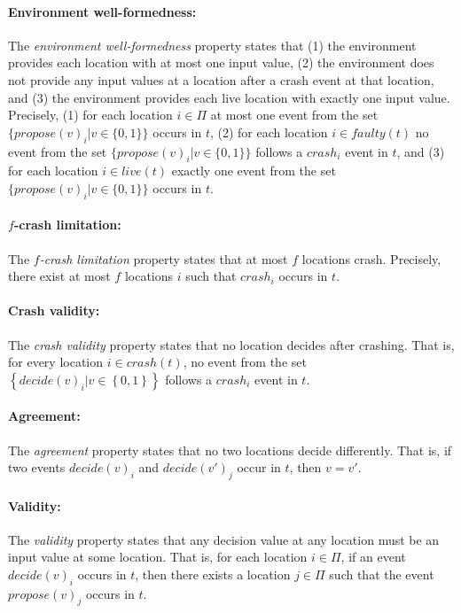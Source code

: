 \documentclass[11pt]{article}
\numberwithin{theorem}{section}
\newcommand{\set}[1]{\left\{#1\right\}}
\begin{document}
\paragraph{Environment well-formedness:} 
The \emph{environment well-formedness} property states that (1) the environment provides each location with 
at most one input value, (2) the environment does not provide any input values at a location after a crash event at that location, and (3) the environment provides each live location with exactly one input value. 
Precisely, (1) for each location $i \in \Pi$
at most one event from the set $\{propose(v)_i|v \in \{0,1\}\}$ occurs in $t$, (2) for each location $i \in faulty(t)$ no event from the set $\{propose(v)_i|v \in \{0,1\}\}$ follows a $crash_i$ event in $t$, and (3) for each location $i \in live(t)$ exactly one event from the set $\{propose(v)_i|v \in \{0,1\}\}$ occurs in $t$.

\paragraph{$f$-crash limitation:} The \emph{$f$-crash limitation} property states that at most $f$ locations crash. Precisely, there exist at most $f$ locations $i$ such that $crash_i$ occurs in $t$. 

\paragraph{Crash validity:} The \emph{crash validity} property states that no location decides after crashing.  That is, for every location $i \in crash(t)$, no event from the set $\set{decide(v)_i| v \in \set{0,1}}$ follows a $crash_i$ event in $t$.

\paragraph{Agreement:} The \emph{agreement} property states that no two locations decide differently. That is, if two events $decide(v)_i$ and $decide(v')_j$ occur in $t$, then $v=v'$. 

\paragraph{Validity:} The \emph{validity} property states that any decision value at any location must be an input value at some location. That is, for each location $i \in \Pi$, if an event $decide(v)_i$ occurs in $t$, then there exists a location $j \in \Pi$ such that the event $propose(v)_j$ occurs in $t$. 
\end{document}

